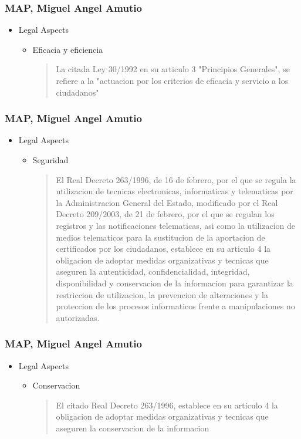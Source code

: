 \documentclass{beamer}
\begin{document}
\begin{frame}
\frametitle{ MAP, Miguel Angel Amutio}

\begin{itemize}
\item Legal Aspects
\begin {itemize}
	\item Eficacia y eficiencia
	\begin{quote} 
La citada Ley 30/1992 en su articulo 3 "Principios Generales", se refiere a la "actuacion por los criterios de eficacia y
servicio a los ciudadanos"

	\end{quote}
\end {itemize}
\end{itemize}

\end{frame}


\begin{frame}
\frametitle{ MAP, Miguel Angel Amutio}

\begin{itemize}
\item Legal Aspects
\begin {itemize}
	\item Seguridad
	\begin{quote} 
El Real Decreto 263/1996, de 16 de febrero, por el que se regula la utilizacion de tecnicas electronicas, informaticas y telematicas
por la Administracion General del Estado, modificado por el Real Decreto 209/2003, de 21 de febrero, por el que se regulan
los registros y las notificaciones telematicas, asi como la utilizacion de medios telematicos para la sustitucion de la aportacion de
certificados por los ciudadanos, establece en su articulo 4 la obligacion de adoptar medidas organizativas y tecnicas
que aseguren la autenticidad, confidencialidad, integridad, disponibilidad y conservacion de la informacion para
garantizar la restriccion de utilizacion, la prevencion de alteraciones y la proteccion de los procesos informaticos
frente a manipulaciones no autorizadas.

	\end{quote}
\end {itemize}
\end{itemize}

\end{frame}


\begin{frame}
\frametitle{ MAP, Miguel Angel Amutio}

\begin{itemize}
\item Legal Aspects
\begin {itemize}
	\item Conservacion
	\begin{quote} 
El citado Real Decreto 263/1996, establece en su articulo 4 la obligacion de adoptar medidas organizativas y
tecnicas que aseguren la conservacion de la informacion

	\end{quote}
\end {itemize}
\end{itemize}

\end{frame}
\end{document}
